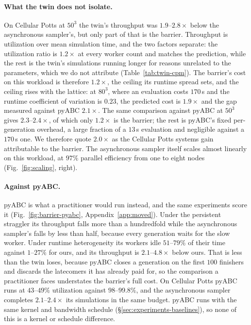 \documentclass[10pt]{article}
\theoremstyle{plain}
\theoremstyle{definition}
\begin{document}
\paragraph{What the twin does not isolate.} On Cellular Potts at $50^3$ the twin's throughput was $1.9$--$2.8\times$ below the asynchronous sampler's, but only part of that is the barrier. Throughput is utilization over mean simulation time, and the two factors separate: the utilization ratio is $1.2\times$ at every worker count and matches the prediction, while the rest is the twin's simulations running longer for reasons unrelated to the parameters, which we do not attribute (Table~\ref{tab:twin-cpm}). The barrier's cost on this workload is therefore $1.2\times$, the ceiling its runtime spread sets, and the ceiling rises with the lattice: at $80^3$, where an evaluation costs $170$\,s and the runtime coefficient of variation is $0.23$, the predicted cost is $1.9\times$ and the gap measured against pyABC $2.1\times$. The same comparison against pyABC at $50^3$ gives $2.3$--$2.4\times$, of which only $1.2\times$ is the barrier; the rest is pyABC's fixed per-generation overhead, a large fraction of a $13$\,s evaluation and negligible against a $170$\,s one. We therefore quote $2.0\times$ as the Cellular Potts systems gain attributable to the barrier. The asynchronous sampler itself scales almost linearly on this workload, at $97\%$ parallel efficiency from one to eight nodes (Fig.~\ref{fig:scaling}, right).

\paragraph{Against pyABC.} pyABC is what a practitioner would run instead, and the same experiments score it (Fig.~\ref{fig:barrier-pyabc}, Appendix~\ref{app:moved}). Under the persistent straggler its throughput falls more than a hundredfold while the asynchronous sampler's falls by less than half, because every generation waits for the slow worker. Under runtime heterogeneity its workers idle $51$--$79\%$ of their time against $1$--$27\%$ for ours, and its throughput is $2.1$--$4.8\times$ below ours. That is less than the twin loses, because pyABC closes a generation on the first $100$ finishers and discards the latecomers it has already paid for, so the comparison a practitioner faces understates the barrier's full cost. On Cellular Potts pyABC runs at $43$--$49\%$ utilization against $98$--$99.8\%$, and the asynchronous sampler completes $2.1$--$2.4\times$ its simulations in the same budget. pyABC runs with the same kernel and bandwidth schedule (\S\ref{sec:experiments-baselines}), so none of this is a kernel or schedule difference.
\end{document}
